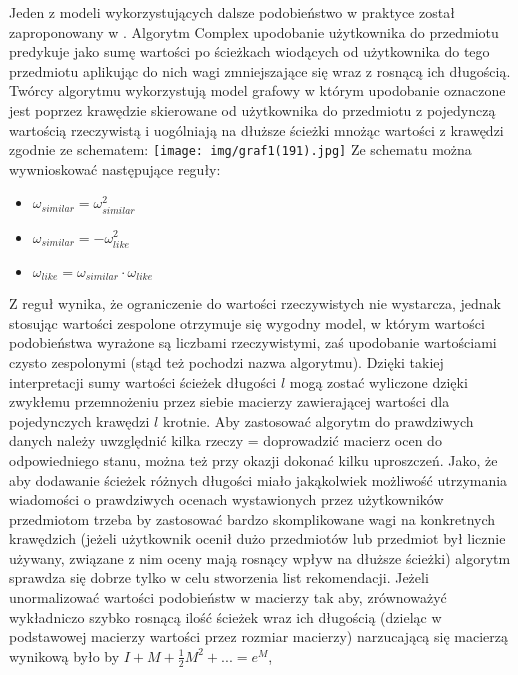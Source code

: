 \documentclass{pracamgr}
\begin{document}
    Jeden z modeli wykorzystujących dalsze podobieństwo w praktyce został zaproponowany w \cite{205}. Algorytm Complex upodobanie użytkownika do przedmiotu
    predykuje jako sumę wartości po ścieżkach wiodących od użytkownika do tego przedmiotu aplikując do nich wagi zmniejszające się wraz z rosnącą ich długością.
    Twórcy algorytmu wykorzystują model grafowy w którym upodobanie oznaczone jest poprzez krawędzie skierowane
    od użytkownika do przedmiotu z pojedynczą wartością rzeczywistą i uogólniają na dłuższe ścieżki mnożąc wartości z krawędzi zgodnie ze schematem:\newline
     \texttt{[image: img/graf1(191).jpg]}\newline
    Ze schematu można wywnioskować następujące reguły:
    \begin{itemize}\itemsep1pt \parskip0pt 
     \item $\omega_{similar}=\omega^2_{similar}$    
     \item $\omega_{similar}=-\omega^2_{like}$
     \item $\omega_{like}=\omega_{similar}\cdot\omega_{like}$
    \end{itemize}
    Z reguł wynika, że ograniczenie do wartości rzeczywistych nie wystarcza, jednak stosując wartości zespolone otrzymuje się wygodny model,
    w którym wartości podobieństwa wyrażone są liczbami rzeczywistymi, zaś upodobanie wartościami czysto zespolonymi (stąd też pochodzi nazwa algorytmu).
    Dzięki takiej interpretacji sumy wartości ścieżek długości $l$ mogą zostać wyliczone dzięki zwykłemu przemnożeniu przez siebie macierzy zawierającej
    wartości dla pojedynczych krawędzi $l$ krotnie.\newline
    Aby zastosować algorytm do prawdziwych danych należy uwzględnić kilka rzeczy = doprowadzić macierz ocen do odpowiedniego stanu,
    można też przy okazji dokonać kilku uproszczeń.
    Jako, że aby dodawanie ścieżek różnych długości miało jakąkolwiek możliwość utrzymania wiadomości
    o prawdziwych ocenach wystawionych przez użytkowników przedmiotom trzeba by zastosować bardzo skomplikowane wagi na konkretnych krawędzich
    (jeżeli użytkownik ocenił dużo przedmiotów lub przedmiot był licznie używany, związane z nim oceny mają rosnący wpływ na dłuższe ścieżki)
    algorytm sprawdza się dobrze tylko w celu stworzenia list rekomendacji.
    Jeżeli unormalizować wartości podobieństw w macierzy tak aby, zrównoważyć wykładniczo szybko rosnącą ilość ścieżek wraz ich długością
    (dzieląc w podstawowej macierzy wartości przez rozmiar macierzy) narzucającą się macierzą wynikową było by $I+M+\frac{1}{2}M^2+...=e^{M}$,
\end{document}
